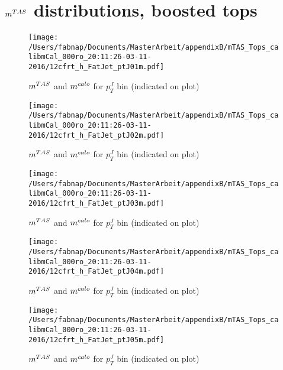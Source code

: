 \clearpage
\onecolumn
\vspace*{\fill}
\section{$m^{TAS}$  distributions, boosted tops}
\vfill
\clearpage
\twocolumn

\begin{figure}
 
\texttt{[image: /Users/fabnap/Documents/MasterArbeit/appendixB/mTAS\_Tops\_calibmCal\_000ro\_20:11:26-03-11-2016/12cfrt\_h\_FatJet\_ptJ01m.pdf]}
\caption{$m^{TAS}$ and $m^{calo}$ for $p_{T}^{J}$ bin (indicated on plot) }
 
\end{figure}
 
\begin{figure}
 
\texttt{[image: /Users/fabnap/Documents/MasterArbeit/appendixB/mTAS\_Tops\_calibmCal\_000ro\_20:11:26-03-11-2016/12cfrt\_h\_FatJet\_ptJ02m.pdf]}
\caption{$m^{TAS}$ and $m^{calo}$ for $p_{T}^{J}$ bin (indicated on plot) }
 
\end{figure}
 
\begin{figure}
 
\texttt{[image: /Users/fabnap/Documents/MasterArbeit/appendixB/mTAS\_Tops\_calibmCal\_000ro\_20:11:26-03-11-2016/12cfrt\_h\_FatJet\_ptJ03m.pdf]}
\caption{$m^{TAS}$ and $m^{calo}$ for $p_{T}^{J}$ bin (indicated on plot) }
 
\end{figure}
 
\begin{figure}
 
\texttt{[image: /Users/fabnap/Documents/MasterArbeit/appendixB/mTAS\_Tops\_calibmCal\_000ro\_20:11:26-03-11-2016/12cfrt\_h\_FatJet\_ptJ04m.pdf]}
\caption{$m^{TAS}$ and $m^{calo}$ for $p_{T}^{J}$ bin (indicated on plot) }
 
\end{figure}
 
\begin{figure}
 
\texttt{[image: /Users/fabnap/Documents/MasterArbeit/appendixB/mTAS\_Tops\_calibmCal\_000ro\_20:11:26-03-11-2016/12cfrt\_h\_FatJet\_ptJ05m.pdf]}
\caption{$m^{TAS}$ and $m^{calo}$ for $p_{T}^{J}$ bin (indicated on plot) }
 
\end{figure}
 
